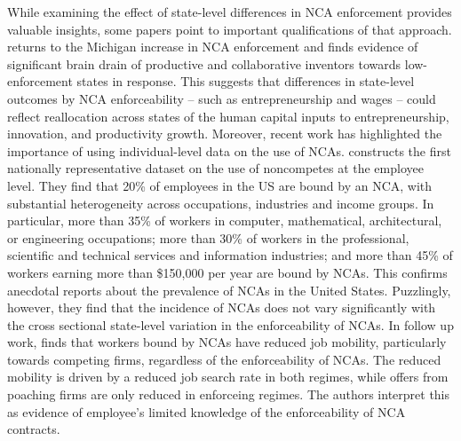 \documentclass[11pt,english]{article}
\theoremstyle{definition}
\begin{document}
While examining the effect of state-level differences in NCA enforcement provides valuable insights, some papers point to important qualifications of that approach. \cite{marx_regional_2015} returns to the Michigan increase in NCA enforcement and finds evidence of significant brain drain of productive and collaborative inventors towards low-enforcement states in response. This suggests that differences in state-level outcomes by NCA enforceability -- such as entrepreneurship and wages -- could reflect reallocation across states of the human capital inputs to entrepreneurship, innovation, and productivity growth. Moreover, recent work has highlighted the importance of using individual-level data on the use of NCAs. \cite{starr_noncompetes_2019} constructs the first nationally representative dataset on the use of noncompetes at the employee level. They find that 20\% of employees in the US are bound by an NCA, with substantial heterogeneity across occupations, industries and income groups. In particular, more than 35\% of workers in computer, mathematical, architectural, or engineering occupations; more than 30\% of workers in the professional, scientific and technical services and information industries; and more than 45\% of workers earning more than \$150,000 per year are bound by NCAs. This confirms anecdotal reports about the prevalence of NCAs in the United States. Puzzlingly, however, they find that the incidence of NCAs does not vary significantly with the cross sectional state-level variation in the enforceability of NCAs. In follow up work, \cite{starr_behavioral_2020} finds that workers bound by NCAs have reduced job mobility, particularly towards competing firms, regardless of the enforceability of NCAs. The reduced mobility is driven by a reduced job search rate in both regimes, while offers from poaching firms are only reduced in enforceing regimes. The authors interpret this as evidence of employee's limited knowledge of the enforceability of NCA contracts.
\end{document}

